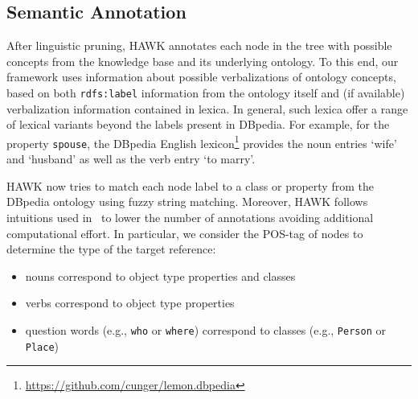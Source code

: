 \subsection{Semantic Annotation}
After linguistic pruning, HAWK annotates each node in the tree with possible concepts from the knowledge base and its underlying ontology.
To this end, our framework uses information about possible verbalizations of ontology concepts, based on both \texttt{rdfs:label} information from the ontology itself and (if available) verbalization information contained in lexica.
In general, such lexica offer a range of lexical variants beyond the labels present in DBpedia. For example, for the property \texttt{spouse}, the DBpedia English lexicon\footnote{\url{https://github.com/cunger/lemon.dbpedia}} provides the noun entries `wife' and `husband' as well as the verb entry `to marry'.


HAWK now tries to match each node label to a class or property from the DBpedia ontology using fuzzy string matching.
Moreover, HAWK follows intuitions used in~\cite{tbsl} to lower the number of annotations avoiding additional computational effort. 
In particular, we consider the POS-tag of nodes to determine the type of the target reference:
\begin{itemize}
\item nouns correspond to object type properties and classes
\item verbs correspond to object type properties
\item question words (e.g., \texttt{who} or \texttt{where}) correspond to classes (e.g., \texttt{Person} or \texttt{Place})
\end{itemize}


